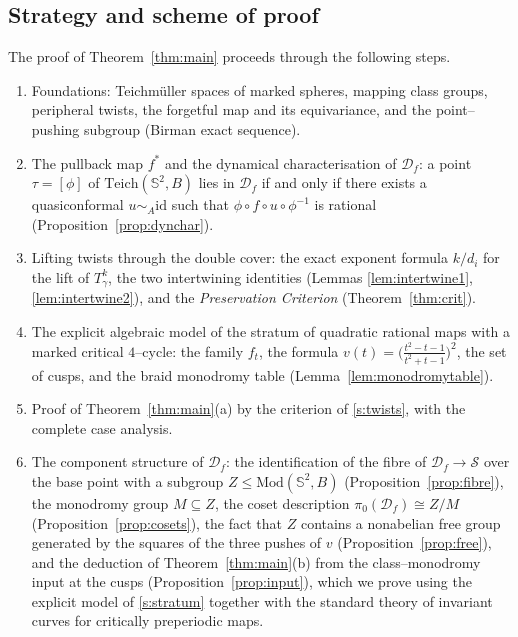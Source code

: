 \documentclass[11pt]{amsart}
\theoremstyle{plain}
\theoremstyle{definition}
\newcommand{\Sph}{\mathbb{S}^2}
\newcommand{\Teich}{\mathrm{Teich}}
\newcommand{\Mod}{\mathrm{Mod}}
\newcommand{\D}{\mathcal{D}}
\newcommand{\S}{\mathcal{S}}
\newcommand{\id}{\mathrm{id}}
\begin{document}
\subsection{Strategy and scheme of proof}

The proof of Theorem~\ref{thm:main} proceeds through the following steps.

\begin{enumerate}
\item[\S\ref{s:prelim}] Foundations: Teichm\"uller spaces of marked spheres,
mapping class groups, peripheral twists, the forgetful map and its
equivariance, and the point--pushing subgroup (Birman exact sequence).
\item[\S\ref{s:pullback}] The pullback map $f^{*}$ and the dynamical
characterisation of $\D_f$: a point $\tau=[\phi]$ of $\Teich(\Sph,B)$ lies
in $\D_f$ if and only if there exists a quasiconformal $u\sim_A\id$ such
that $\phi\circ f\circ u\circ\phi^{-1}$ is rational
(Proposition~\ref{prop:dynchar}).
\item[\S\ref{s:twists}] Lifting twists through the double cover: the exact
exponent formula $k/d_i$ for the lift of $T_\gamma^{k}$, the two
intertwining identities (Lemmas \ref{lem:intertwine1}, \ref{lem:intertwine2}),
and the \emph{Preservation Criterion} (Theorem~\ref{thm:crit}).
\item[\S\ref{s:stratum}] The explicit algebraic model of the stratum of
quadratic rational maps with a marked critical $4$--cycle: the family
$f_t$, the formula $v(t)=\bigl(\tfrac{t^2-t-1}{t^2+t-1}\bigr)^{2}$, the set
of cusps, and the braid monodromy table
(Lemma~\ref{lem:monodromytable}).
\item[\S\ref{s:preserve}] Proof of Theorem~\ref{thm:main}(a) by the
criterion of \S\ref{s:twists}, with the complete case analysis.
\item[\S\ref{s:components}] The component structure of $\D_f$: the
identification of the fibre of $\D_f\to\S$ over the base point with a
subgroup $Z\le\Mod(\Sph,B)$ (Proposition~\ref{prop:fibre}), the monodromy
group $M\subseteq Z$, the coset description
$\pi_0(\D_f)\cong Z/M$ (Proposition~\ref{prop:cosets}), the fact that
$Z$ contains a nonabelian free group generated by the squares of the three
pushes of $v$ (Proposition~\ref{prop:free}), and the deduction of
Theorem~\ref{thm:main}(b) from the class--monodromy input at the cusps
(Proposition~\ref{prop:input}), which we prove using the explicit model of
\S\ref{s:stratum} together with the standard theory of invariant curves for
critically preperiodic maps.
\end{enumerate}
\end{document}
